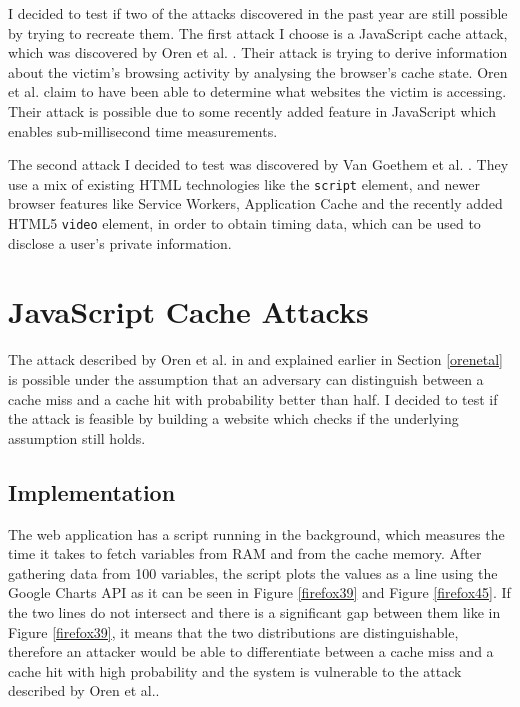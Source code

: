 \documentclass[10pt,a4paper,twoside]{book}
\begin{document}
I decided to test if two of the attacks discovered in the past year are still possible by trying to recreate them. The first attack I choose is a JavaScript cache attack, which was discovered by Oren et al. \cite{oren2015spy}. Their attack is trying to derive information about the victim's browsing activity by analysing the browser's cache state. Oren et al. \cite{oren2015spy} claim to have been able to determine what websites the victim is accessing. Their attack is possible due to some recently added feature in JavaScript which enables sub-millisecond time measurements.

The second attack I decided to test was discovered by Van Goethem et al. \cite{van2015clock}. They use a mix of existing HTML technologies like the \texttt{script} element, and newer browser features like Service Workers, Application Cache and the recently added HTML5 \texttt{video} element, in order to obtain timing data, which can be used to disclose a user's private information.


\section{JavaScript Cache Attacks}

The attack described by Oren et al. in \cite{oren2015spy} and explained earlier in Section \ref{orenetal} is possible under the assumption that an adversary can distinguish between a cache miss and a cache hit with probability better than half. I decided to test if the attack is feasible by building a website which checks if the underlying assumption still holds. 

\subsection{Implementation}

The web application has a script running in the background, which measures the time it takes to fetch variables from RAM and from the cache memory. After gathering data from 100 variables, the script plots the values as a line using the Google Charts API \cite{googlecharts} as it can be seen in Figure \ref{firefox39} and Figure \ref{firefox45}. If the two lines do not intersect and there is a significant gap between them like in Figure \ref{firefox39}, it means that the two distributions are distinguishable, therefore an attacker would be able to differentiate between a cache miss and a cache hit with high probability and the system is vulnerable to the attack described by Oren et al.\cite{oren2015spy}. 
\end{document}
